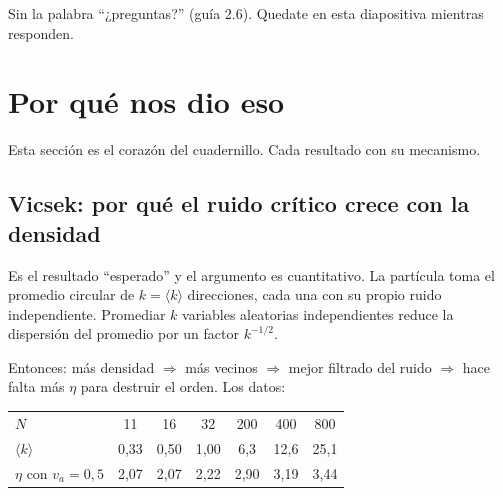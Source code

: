 \documentclass[11pt]{article}
\begin{document}


Sin la palabra ``¿preguntas?'' (guía 2.6). Quedate en esta diapositiva mientras
responden.

\section{Por qué nos dio eso}

Esta sección es el corazón del cuadernillo. Cada resultado con su mecanismo.

\subsection{Vicsek: por qué el ruido crítico crece con la densidad}

Es el resultado ``esperado'' y el argumento es cuantitativo. La partícula toma
el promedio circular de $k = \langle k \rangle$ direcciones, cada una con su
propio ruido independiente. Promediar $k$ variables aleatorias independientes
reduce la dispersión del promedio por un factor $k^{-1/2}$.

Entonces: más densidad $\Rightarrow$ más vecinos $\Rightarrow$ mejor filtrado
del ruido $\Rightarrow$ hace falta más $\eta$ para destruir el orden. Los datos:

\begin{center}
\begin{tabular}{lcccccc}
\toprule
$N$ & 11 & 16 & 32 & 200 & 400 & 800 \\
$\langle k \rangle$ & 0{,}33 & 0{,}50 & 1{,}00 & 6{,}3 & 12{,}6 & 25{,}1 \\
\midrule
$\eta$ con $v_a = 0{,}5$ & 2{,}07 & 2{,}07 & 2{,}22 & 2{,}90 & 3{,}19 & 3{,}44 \\
\bottomrule
\end{tabular}
\end{center}

\end{document}
